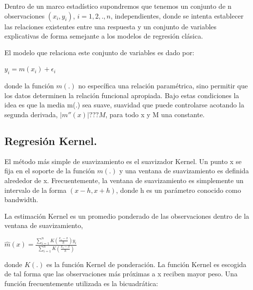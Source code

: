 \hspace*{0.4 cm} Dentro de un marco estad\'istico supondremos que tenemos un conjunto
de n observaciones $(x_{i}, y_{i})$, $i= 1, 2,., n$, independientes, donde se intenta
establecer las relaciones existentes entre una respuesta y un conjunto de
variables explicativas de forma semejante a los modelos de regresi\'on
cl\'asica.


\hspace*{0.4 cm} El modelo que relaciona este conjunto de variables es dado por:

\begin{center}
$\displaystyle{y_{i} = m(x_{i}) + \epsilon_{i}}$
\end{center} 



\noindent donde la funci\'on $m(.)$ no espec\'ifica una relaci\'on param\'etrica, sino
permitir que los datos determinen la relaci\'on funcional apropiada. Bajo
estas condiciones la idea es que la media m(.) sea suave, suavidad que
puede controlarse acotando la segunda derivada, $|m''(x)|???M$, para todo
x y M una constante.

\subsection{Regresi\'on Kernel.\\}


\hspace*{0.4 cm} El m\'etodo m\'as simple de suavizamiento es el suavizador Kernel. Un
punto x se fija en el soporte de la funci\'on $m(.)$ y una ventana de
suavizamiento es definida alrededor de x. Frecuentemente, la ventana de
suavizamiento es simplemente un intervalo de la forma $(x - h, x + h)$,
donde h es un par\'ametro conocido como bandwidth.

\hspace*{0.4 cm} La estimaci\'on Kernel es un promedio ponderado de las observaciones
dentro de la ventana de suavizamiento,

\begin{center}
$\displaystyle{\hat{m}(x) = \frac{\sum_{i=1}^{n} K(\frac{x_{i}-x}{h}) y_{i}}{\sum_{i=1}^{n} K(\frac{x_{i}-x}{h})}}$
\end{center}

\vspace*{0.2 cm}

\noindent donde $K(.)$ es la funci\'on Kernel de ponderaci\'on. La funci\'on Kernel es escogida
de tal forma que las observaciones m\'as pr\'oximas a x reciben mayor peso. Una
funci\'on frecuentemente utilizada es la bicuadr\'atica:

